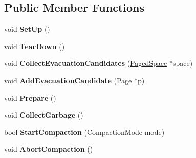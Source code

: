 \subsection*{Public Member Functions}
\begin{DoxyCompactItemize}
\item 
void {\bfseries Set\+Up} ()\hypertarget{classv8_1_1internal_1_1_mark_compact_collector_a1e1fe87a7f9547f8db306169e3744598}{}\label{classv8_1_1internal_1_1_mark_compact_collector_a1e1fe87a7f9547f8db306169e3744598}

\item 
void {\bfseries Tear\+Down} ()\hypertarget{classv8_1_1internal_1_1_mark_compact_collector_ac79654a97e006616402d89dcec98eac7}{}\label{classv8_1_1internal_1_1_mark_compact_collector_ac79654a97e006616402d89dcec98eac7}

\item 
void {\bfseries Collect\+Evacuation\+Candidates} (\hyperlink{classv8_1_1internal_1_1_paged_space}{Paged\+Space} $\ast$space)\hypertarget{classv8_1_1internal_1_1_mark_compact_collector_a3cf7f62c683dbc4b89a6f71b7d60cc37}{}\label{classv8_1_1internal_1_1_mark_compact_collector_a3cf7f62c683dbc4b89a6f71b7d60cc37}

\item 
void {\bfseries Add\+Evacuation\+Candidate} (\hyperlink{classv8_1_1internal_1_1_page}{Page} $\ast$p)\hypertarget{classv8_1_1internal_1_1_mark_compact_collector_a0859ca3d00c450bb2c5a354add25fff4}{}\label{classv8_1_1internal_1_1_mark_compact_collector_a0859ca3d00c450bb2c5a354add25fff4}

\item 
void {\bfseries Prepare} ()\hypertarget{classv8_1_1internal_1_1_mark_compact_collector_a88bb504c9d7b76a16ab2f067e907574c}{}\label{classv8_1_1internal_1_1_mark_compact_collector_a88bb504c9d7b76a16ab2f067e907574c}

\item 
void {\bfseries Collect\+Garbage} ()\hypertarget{classv8_1_1internal_1_1_mark_compact_collector_a82db441b928fc8abc959d3d4c7c18906}{}\label{classv8_1_1internal_1_1_mark_compact_collector_a82db441b928fc8abc959d3d4c7c18906}

\item 
bool {\bfseries Start\+Compaction} (Compaction\+Mode mode)\hypertarget{classv8_1_1internal_1_1_mark_compact_collector_aab1645449be7dca6f0a6eff2be78ddc7}{}\label{classv8_1_1internal_1_1_mark_compact_collector_aab1645449be7dca6f0a6eff2be78ddc7}

\item 
void {\bfseries Abort\+Compaction} ()\hypertarget{classv8_1_1internal_1_1_mark_compact_collector_a4fdf8ab05e0f2a84df042b4197fcda89}{}\label{classv8_1_1internal_1_1_mark_compact_collector_a4fdf8ab05e0f2a84df042b4197fcda89}


\end{DoxyCompactItemize}
